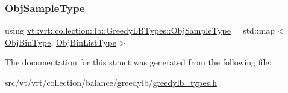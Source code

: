 \subsubsection{\texorpdfstring{Obj\+Sample\+Type}{ObjSampleType}}
{\footnotesize\ttfamily using \hyperlink{structvt_1_1vrt_1_1collection_1_1lb_1_1_greedy_l_b_types_a467f8a79d0785fca5fc95bd5c0f406b9}{vt\+::vrt\+::collection\+::lb\+::\+Greedy\+L\+B\+Types\+::\+Obj\+Sample\+Type} =  std\+::map$<$\hyperlink{structvt_1_1vrt_1_1collection_1_1lb_1_1_greedy_l_b_types_ae0dc433e9afe6112dd0a7ba402e0d6c2}{Obj\+Bin\+Type}, \hyperlink{structvt_1_1vrt_1_1collection_1_1lb_1_1_greedy_l_b_types_a5f1f5da7ec80da0de64a9d91624c396b}{Obj\+Bin\+List\+Type}$>$}



The documentation for this struct was generated from the following file\+:\begin{DoxyCompactItemize}
\item 
src/vt/vrt/collection/balance/greedylb/\hyperlink{greedylb__types_8h}{greedylb\+\_\+types.\+h}\end{DoxyCompactItemize}
